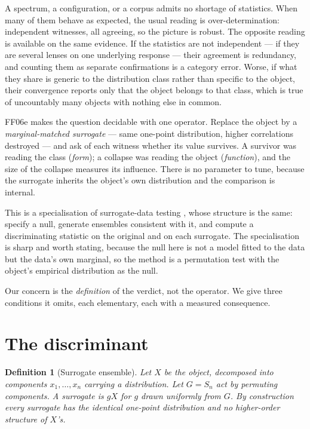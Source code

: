 \documentclass[11pt]{article}
\newtheorem{definition}{Definition}
\theoremstyle{remark}
\begin{document}
A spectrum, a configuration, or a corpus admits no shortage of statistics. When many of
them behave as expected, the usual reading is over-determination: independent witnesses,
all agreeing, so the picture is robust. The opposite reading is available on the same
evidence. If the statistics are not independent --- if they are several lenses on one
underlying response --- their agreement is redundancy, and counting them as separate
confirmations is a category error. Worse, if what they share is generic to the
distribution class rather than specific to the object, their convergence reports only
that the object belongs to that class, which is true of uncountably many objects with
nothing else in common.

FF06e makes the question decidable with one operator. Replace the object by a
\emph{marginal-matched surrogate} --- same one-point distribution, higher correlations
destroyed --- and ask of each witness whether its value survives. A survivor was reading
the class (\emph{form}); a collapse was reading the object (\emph{function}), and the
size of the collapse measures its influence. There is no parameter to tune, because the
surrogate inherits the object's own distribution and the comparison is internal.

This is a specialisation of surrogate-data testing \cite{theiler}, whose structure is the
same: specify a null, generate ensembles consistent with it, and compute a discriminating
statistic on the original and on each surrogate. The specialisation is sharp and worth
stating, because the null here is not a model fitted to the data but the data's own
marginal, so the method is a permutation test with the object's empirical distribution as
the null.

Our concern is the \emph{definition} of the verdict, not the operator. We give three
conditions it omits, each elementary, each with a measured consequence.

\section{The discriminant}\label{sec:disc}

\begin{definition}[Surrogate ensemble]
Let $X$ be the object, decomposed into components $x_1,\dots,x_n$ carrying a
distribution. Let $G = S_n$ act by permuting components. A \emph{surrogate} is $gX$ for
$g$ drawn uniformly from $G$. By construction every surrogate has the identical
one-point distribution and no higher-order structure of $X$'s.
\end{definition}
\end{document}
